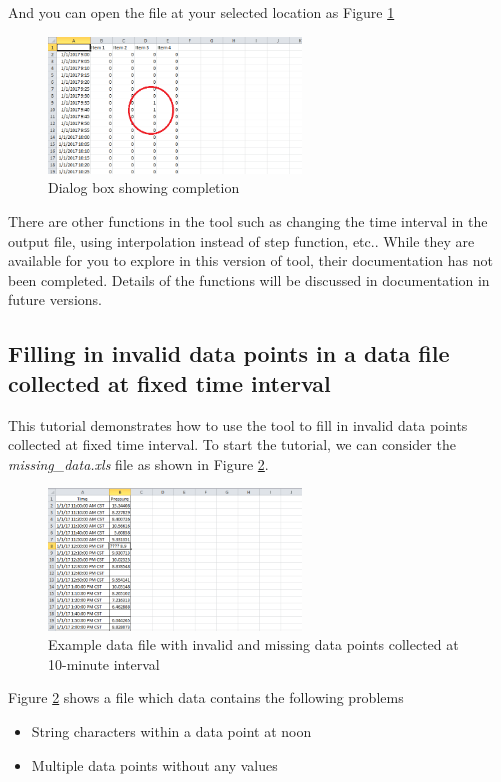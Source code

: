 \documentclass[12pt,a4paper]{article}
\begin{document}
And you can open the file at your selected location as Figure \ref{fig:step}

\begin{figure}[H]
\centering
\includegraphics[width=0.6\textwidth]{step.png}
\caption{Dialog box showing completion}
\label{fig:step}
\end{figure}

There are other functions in the tool such as changing the time interval in the output file, using interpolation instead of step function, etc..
While they are available for you to explore in this version of tool, their documentation has not been completed.
Details of the functions will be discussed in documentation in future versions.

\subsection{Filling in invalid data points in a data file collected at fixed time interval}

This tutorial demonstrates how to use the tool to fill in invalid data points collected at fixed time interval.
To start the tutorial, we can consider the \emph{missing\_data.xls} file as shown in Figure \ref{fig:missing_data}.

\begin{figure}[H]
\centering
\includegraphics[width=0.6\textwidth]{missing_data.png}
\caption{Example data file with invalid and missing data points collected at 10-minute interval}
\label{fig:missing_data}
\end{figure}

Figure \ref{fig:missing_data} shows a file which data contains the following problems
\begin{itemize}
\item String characters within a data point at noon
\item Multiple data points without any values
\end{itemize}
\end{document}
